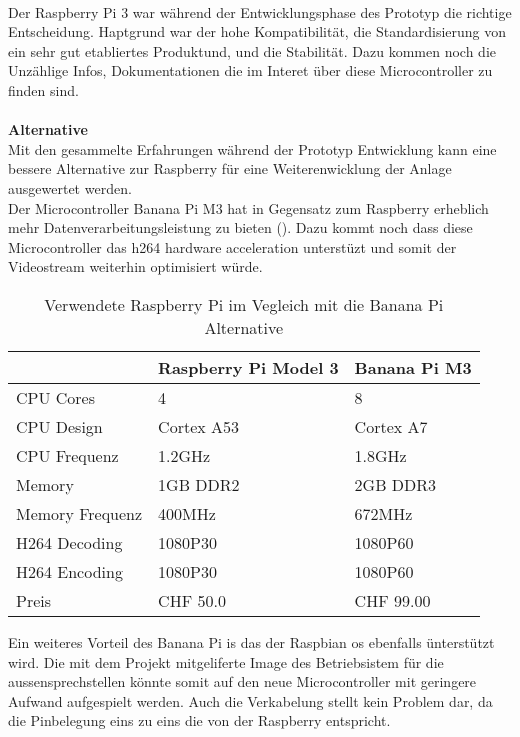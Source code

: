 \\
Der Raspberry Pi 3 war während der Entwicklungsphase des Prototyp die richtige Entscheidung. Haptgrund war der hohe Kompatibilität, die Standardisierung von ein sehr gut etabliertes Produktund, und die Stabilität. Dazu kommen noch die Unzählige Infos, Dokumentationen die im Interet über diese Microcontroller zu finden sind.
\\
\\
\textbf{Alternative}
\\ 
Mit den gesammelte Erfahrungen während der Prototyp Entwicklung kann eine bessere Alternative zur Raspberry für eine Weiterenwicklung der Anlage ausgewertet werden. 
\\
Der Microcontroller Banana Pi M3 hat in Gegensatz zum Raspberry erheblich mehr Datenverarbeitungsleistung zu bieten (). Dazu kommt noch dass diese Microcontroller das \gls{h264} hardware acceleration unterstüzt und somit der Videostream weiterhin optimisiert würde.

\begin{table}[]     
	\centering
	\label{microcontrollerComparison}
	\begin{tabular}{l|ll}
		\multicolumn{1}{r|}{} & Raspberry Pi Model 3 & Banana Pi M3 \\ \hline
		CPU Cores             & 4                    & 8            \\ \hline
		CPU Design            & Cortex A53           & Cortex A7    \\ \hline
		CPU Frequenz          & 1.2GHz               & 1.8GHz       \\ \hline
		Memory                & 1GB DDR2             & 2GB DDR3     \\ \hline
		Memory Frequenz       & 400MHz               & 672MHz       \\ \hline
		H264 Decoding         & 1080P30              & 1080P60      \\ \hline
		H264 Encoding         & 1080P30              & 1080P60      \\ \hline
		Preis				  & CHF 50.0             & CHF 99.00    \\ \hline
	\end{tabular}
	\caption{Verwendete Raspberry Pi im Vegleich mit die Banana Pi Alternative}
	\label{tbl:microcontrollerComparison}
\end{table}

Ein weiteres Vorteil des Banana Pi is das der Raspbian \gls{os} ebenfalls ünterstützt wird. Die mit dem Projekt mitgeliferte Image des Betriebsistem für die \gls{aussensprechstelle}n könnte somit auf den neue Microcontroller mit geringere Aufwand aufgespielt werden. Auch die Verkabelung stellt kein Problem dar, da die Pinbelegung eins zu eins die von der Raspberry entspricht.
\\
